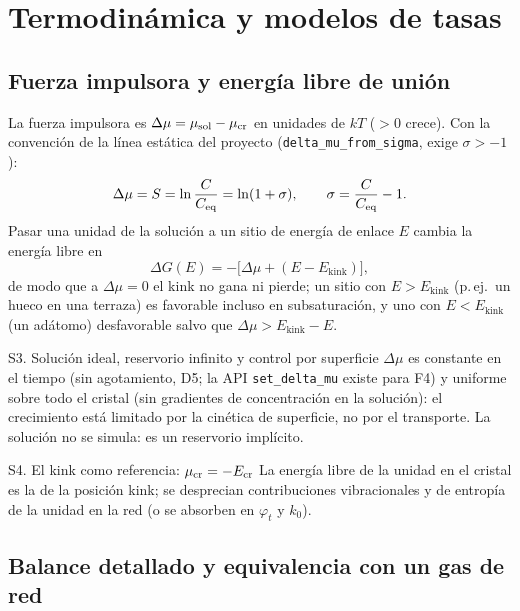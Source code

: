 \documentclass[11pt,a4paper]{article}
\newcommand{\code}[1]{\texttt{#1}}
\newcommand{\Ekink}{E_{\mathrm{kink}}}
\newcommand{\Ecr}{E_{\mathrm{cr}}}
\newcommand{\dmu}{\Delta\mu}
\begin{document}
\section{Termodinámica y modelos de tasas}
\label{sec:tasas}

\subsection{Fuerza impulsora y energía libre de unión}

La fuerza impulsora es $\dmu=\mu_{\rm sol}-\mu_{\rm cr}$ en unidades de $kT$ ($>0$ crece). Con la
convención de la línea estática del proyecto (\code{delta\_mu\_from\_sigma}, exige $\sigma>-1$):
\begin{equation}
\dmu=S=\ln\frac{C}{C_{\rm eq}}=\ln(1+\sigma),\qquad \sigma=\frac{C}{C_{\rm eq}}-1 .
\label{eq:dmu}
\end{equation}
Pasar una unidad de la solución a un sitio de energía de enlace $E$ cambia la energía libre en
\begin{equation}
\Delta G(E)=-\bigl[\dmu+(E-\Ekink)\bigr],
\label{eq:dG}
\end{equation}
de modo que a $\dmu=0$ el kink no gana ni pierde; un sitio con $E>\Ekink$ (p.\,ej.\ un hueco en una
terraza) es favorable incluso en subsaturación, y uno con $E<\Ekink$ (un adátomo) desfavorable salvo
que $\dmu>\Ekink-E$.

\begin{supuesto}{S3. Solución ideal, reservorio infinito y control por superficie}
$\dmu$ es constante en el tiempo (sin agotamiento, D5; la API \code{set\_delta\_mu} existe para F4) y
uniforme sobre todo el cristal (sin gradientes de concentración en la solución): el crecimiento está
limitado por la cinética de superficie, no por el transporte. La solución no se simula: es un
reservorio implícito.
\end{supuesto}
\begin{supuesto}{S4. El kink como referencia: $\mu_{\rm cr}=-\Ecr$}
La energía libre de la unidad en el cristal es la de la posición kink; se desprecian contribuciones
vibracionales y de entropía de la unidad en la red (o se absorben en $\varphi_t$ y $k_0$).
\end{supuesto}

\subsection{Balance detallado y equivalencia con un gas de red}
\label{sec:gasred}
\end{document}
